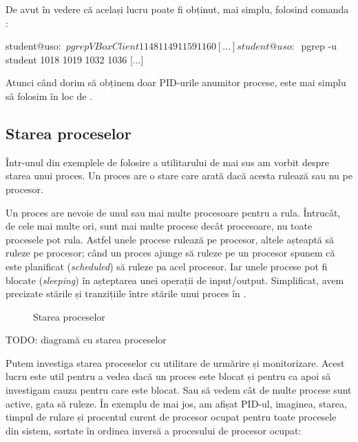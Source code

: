 De avut în vedere că același lucru poate fi obținut, mai simplu, folosind
comanda :

\begin{screen}
student@uso:~$ pgrep VBoxClient
1148
1149
1159
1160
[...]
student@uso:~$ pgrep -u student
1018
1019
1032
1036
[...]
\end{screen}

Atunci când dorim să obținem doar PID-urile anumitor procese, este mai simplu să
folosim  în loc de .

\subsection{Starea proceselor}
\label{sec:procese-resurse-stare}

Într-unul din exemplele de folosire a utilitarului  de mai sus am vorbit
despre starea unui proces. Un proces are o stare care arată dacă acesta rulează
sau nu pe procesor.

Un proces are nevoie de unul sau mai multe procesoare pentru a rula. Întrucât,
de cele mai multe ori, sunt mai multe procese decât procesoare, nu toate
procesele pot rula. Astfel unele procese rulează pe procesor, altele așteaptă să
ruleze pe procesor; când un proces ajunge să ruleze pe un procesor spunem că
este planificat (\textit{scheduled}) să ruleze pa acel procesor. Iar unele
procese pot fi blocate (\textit{sleeping}) în așteptarea unei operații de
input/output. Simplificat, avem precizate stările și tranzițiile între stările unui proces în .

\begin{figure}[!htbp]
	\centering
        \def\svgwidth{0.8\textwidth}
        
        \caption{Starea proceselor}
        \label{fig:process-state}
\end{figure}
TODO: diagramă cu starea proceselor

Putem investiga starea proceselor cu utilitare de urmărire și monitorizare.
Acest lucru este util pentru a vedea dacă un proces este blocat și pentru ca
apoi să investigam cauza pentru care este blocat. Sau să vedem cât de multe
procese sunt active, gata să ruleze. În exemplu de mai jos, am afișat PID-ul,
imaginea, starea, timpul de rulare și procentul curent de procesor ocupat pentru
toate procesele din sistem, sortate în ordinea inversă a procesului de procesor ocupat:


